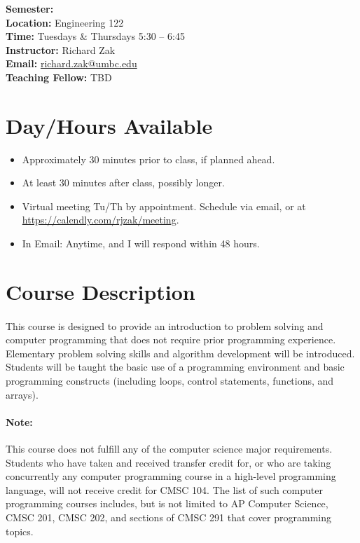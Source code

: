 \documentclass[letter,10pt]{article}
\begin{document}
\textbf{Semester:} \\
\textbf{Location:} Engineering 122 \\
\textbf{Time:} Tuesdays \& Thursdays 5:30 -- 6:45 \\
\textbf{Instructor:} Richard Zak \\
\textbf{Email:} \href{mailto:richard.zak@umbc.edu?Subject=CMSC104}{richard.zak@umbc.edu} \\
\textbf{Teaching Fellow:} TBD \\

\section*{Day/Hours Available}
\begin{itemize}
\item Approximately 30 minutes prior to class, if planned ahead.
\item At least 30 minutes after class, possibly longer.
\item Virtual meeting Tu/Th by appointment. Schedule via email, or at \url{https://calendly.com/rjzak/meeting}.
\item In Email: Anytime, and I will respond within 48 hours.
\end{itemize}

\section*{Course Description}
\paragraph{}This course is designed to provide an introduction to problem solving and computer programming that does not require prior programming experience. Elementary problem solving skills and algorithm development will be introduced. Students will be taught the basic use of a programming environment and basic programming constructs (including loops, control statements, functions, and arrays).

\paragraph{Note:}This course does not fulfill any of the computer science major requirements. Students who have taken and received transfer credit for, or who are taking concurrently any computer programming course in a high-level programming language, will not receive credit for CMSC 104. The list of such computer programming courses includes, but is not limited to AP Computer Science, CMSC 201, CMSC 202, and sections of CMSC 291 that cover programming topics.
\end{document}
